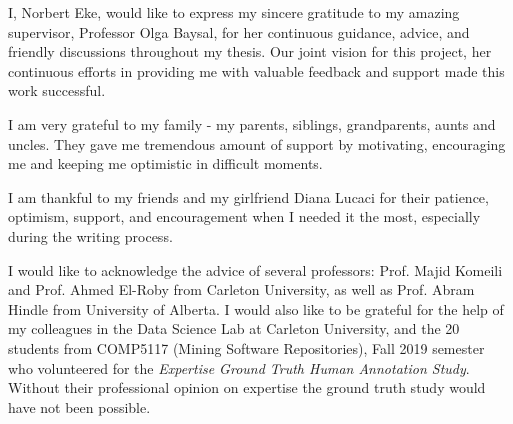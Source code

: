 I, Norbert Eke, would like to express my sincere gratitude to my amazing supervisor, Professor Olga Baysal, for her continuous guidance, advice, and friendly discussions throughout my thesis. Our joint vision for this project, her continuous efforts in providing me with valuable feedback and support made this work successful. 

I am very grateful to my family - my parents, siblings, grandparents, aunts and uncles. They gave me tremendous amount of support by motivating, encouraging me and keeping me optimistic in difficult moments.

I am thankful to my friends and my girlfriend Diana Lucaci for their patience, optimism, support, and encouragement when I needed it the most, especially during the writing process. 

I would like to acknowledge the advice of several professors: Prof. Majid Komeili and Prof. Ahmed El-Roby from Carleton University, as well as Prof. Abram Hindle from University of Alberta. I would also like to be grateful for the help of my colleagues in the Data Science Lab at Carleton University, and the 20 students from COMP5117 (Mining Software Repositories), Fall 2019 semester who volunteered for the \emph{Expertise Ground Truth Human Annotation Study}. Without their professional opinion on expertise the ground truth study would have not been possible.  
